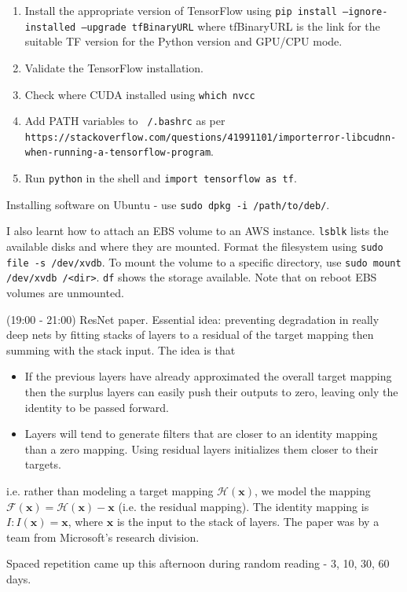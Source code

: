 \documentclass[idxtotoc,hyperref,openany]{labbook} %
\begin{document}
\begin{enumerate}
	\item Install the appropriate version of TensorFlow using \texttt{pip install --ignore-installed --upgrade tfBinaryURL} where tfBinaryURL is the link for the suitable TF version for the Python version and GPU/CPU mode.
	\item Validate the TensorFlow installation.
	\item Check where CUDA installed using \texttt{which nvcc}
	\item Add PATH variables to \texttt{~/.bashrc} as per \texttt{https://stackoverflow.com/questions/41991101/importerror-libcudnn-when-running-a-tensorflow-program}.
	\item Run \texttt{python} in the shell and \texttt{import tensorflow as tf}.
\end{enumerate}
Installing software on Ubuntu - use \texttt{sudo dpkg -i /path/to/deb/}.

I also learnt how to attach an EBS volume to an AWS instance. \texttt{lsblk} lists the available disks and where they are mounted. Format the filesystem using \texttt{sudo file -s /dev/xvdb}. To mount the volume to a specific directory, use \texttt{sudo mount /dev/xvdb /<dir>}. \texttt{df} shows the storage available. Note that on reboot EBS volumes are unmounted.

(19:00 - 21:00) ResNet paper. Essential idea: preventing degradation in really deep nets by fitting stacks of layers to a residual of the target mapping then summing with the stack input. The idea is that
\begin{itemize}
	\item If the previous layers have already approximated the overall target mapping then the surplus layers can easily push their outputs to zero, leaving only the identity to be passed forward.
	\item Layers will tend to generate filters that are closer to an identity mapping than a zero mapping. Using residual layers initializes them closer to their targets.
\end{itemize}
i.e. rather than modeling a target mapping $\mathcal{H}(\mathbf{x})$, we model the mapping $\mathcal{F}(\mathbf{x}) = \mathcal{H}(\mathbf{x}) - \mathbf{x}$ (i.e. the residual mapping). The identity mapping is $I : I(\mathbf{x}) = \mathbf{x}$, where $\mathbf{x}$ is the input to the stack of layers. The paper was by a team from Microsoft's research division.

Spaced repetition came up this afternoon during random reading - 3, 10, 30, 60 days.
\end{document}
